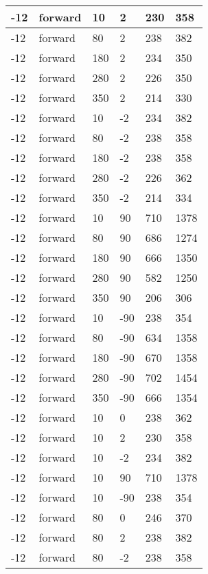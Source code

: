 \begin{longtable}{|l|l|l|l|l|l|}
			\hline
			-12 & forward & 10 & 2 & 230 & 358 \\
			\hline
			-12 & forward & 80 & 2 & 238 & 382 \\
			\hline
			-12 & forward & 180 & 2 & 234 & 350 \\
			\hline
			-12 & forward & 280 & 2 & 226 & 350 \\
			\hline
			-12 & forward & 350 & 2 & 214 & 330 \\
			\hline
			-12 & forward & 10 & -2 & 234 & 382 \\
			\hline
			-12 & forward & 80 & -2 & 238 & 358 \\
			\hline
			-12 & forward & 180 & -2 & 238 & 358 \\
			\hline
			-12 & forward & 280 & -2 & 226 & 362 \\
			\hline
			-12 & forward & 350 & -2 & 214 & 334 \\
			\hline
			-12 & forward & 10 & 90 & 710 & 1378 \\
			\hline
			-12 & forward & 80 & 90 & 686 & 1274 \\
			\hline
			-12 & forward & 180 & 90 & 666 & 1350 \\
			\hline
			-12 & forward & 280 & 90 & 582 & 1250 \\
			\hline
			-12 & forward & 350 & 90 & 206 & 306 \\
			\hline
			-12 & forward & 10 & -90 & 238 & 354 \\
			\hline
			-12 & forward & 80 & -90 & 634 & 1358 \\
			\hline
			-12 & forward & 180 & -90 & 670 & 1358 \\
			\hline
			-12 & forward & 280 & -90 & 702 & 1454 \\
			\hline
			-12 & forward & 350 & -90 & 666 & 1354 \\
			\hline
			-12 & forward & 10 & 0 & 238 & 362 \\
			\hline
			-12 & forward & 10 & 2 & 230 & 358 \\
			\hline
			-12 & forward & 10 & -2 & 234 & 382 \\
			\hline
			-12 & forward & 10 & 90 & 710 & 1378 \\
			\hline
			-12 & forward & 10 & -90 & 238 & 354 \\
			\hline
			-12 & forward & 80 & 0 & 246 & 370 \\
			\hline
			-12 & forward & 80 & 2 & 238 & 382 \\
			\hline
			-12 & forward & 80 & -2 & 238 & 358 \\
			\hline

\end{longtable}
